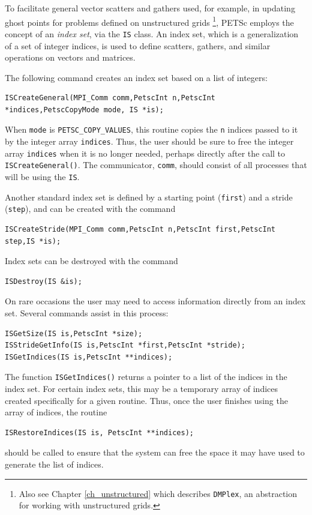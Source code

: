 To facilitate general vector scatters and gathers used, for example, in updating
ghost points for problems defined on unstructured grids
\footnote{Also see Chapter \ref{ch_unstructured} which describes \lstinline{DMPlex}, an abstraction for working with unstructured grids.},
PETSc employs the concept of an {\em index set}, via the \lstinline{IS} class.
An index set, which is a generalization of a
set of integer indices, is used to define scatters, gathers, and similar
operations on vectors and matrices.

The following command creates an index set based on a list
of integers:
\begin{lstlisting}
ISCreateGeneral(MPI_Comm comm,PetscInt n,PetscInt *indices,PetscCopyMode mode, IS *is);
\end{lstlisting}
When \lstinline{mode} is \lstinline{PETSC_COPY_VALUES}, this routine copies the \lstinline{n} indices passed
to it by the integer array \lstinline{indices}.
Thus, the user should be sure to free the integer array \lstinline{indices}
when it is no longer needed, perhaps directly after the call to
\lstinline{ISCreateGeneral()}. The communicator, \lstinline{comm}, should consist of all
processes that will be using the \lstinline{IS}.

Another standard index set is defined by a starting point (\lstinline{first}) and a
stride (\lstinline{step}),  and can be created with the command
\begin{lstlisting}
ISCreateStride(MPI_Comm comm,PetscInt n,PetscInt first,PetscInt step,IS *is);
\end{lstlisting}

Index sets can be destroyed with the command
\begin{lstlisting}
ISDestroy(IS &is);
\end{lstlisting}

On rare occasions the user may need to access information directly from an index set.
Several commands assist in this process:
\begin{lstlisting}
ISGetSize(IS is,PetscInt *size);
ISStrideGetInfo(IS is,PetscInt *first,PetscInt *stride);
ISGetIndices(IS is,PetscInt **indices);
\end{lstlisting}
The function \lstinline{ISGetIndices()} returns a pointer to a list of the
indices in the index set.
For certain index sets, this may be a
temporary array of indices created specifically for a given routine.
Thus, once the user finishes using the array of indices,
the routine
\begin{lstlisting}
ISRestoreIndices(IS is, PetscInt **indices);
\end{lstlisting}
should be called to ensure that the system can free the space it
may have used to generate the list of indices.

